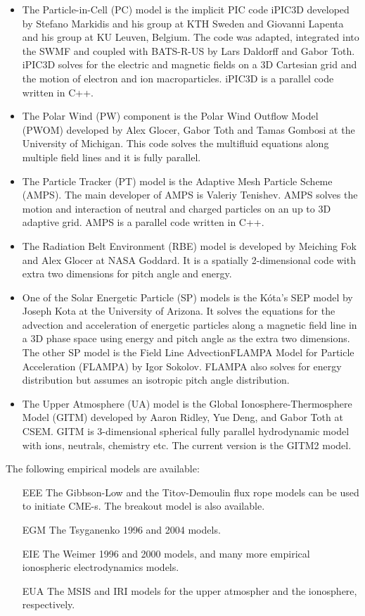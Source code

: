 \begin{itemize}
\item
The Particle-in-Cell (PC) model is the implicit PIC code iPIC3D
developed by Stefano Markidis and his group at KTH Sweden
and Giovanni Lapenta and his group at KU Leuven, Belgium.
The code was adapted, integrated into the SWMF and coupled
with BATS-R-US by Lars Daldorff and Gabor Toth.
iPIC3D solves for the electric and magnetic fields on 
a 3D Cartesian grid and the motion of electron and ion
macroparticles. iPIC3D is a parallel code written in C++. 

\item
The Polar Wind (PW) component is the Polar Wind Outflow Model (PWOM)
developed by Alex Glocer, Gabor Toth and Tamas Gombosi
at the University of Michigan.  This code solves the
multifluid equations along multiple field lines and it is fully parallel.

\item
The Particle Tracker (PT) model is the Adaptive Mesh Particle Scheme (AMPS).
The main developer of AMPS is Valeriy Tenishev. AMPS solves the motion
and interaction of neutral and charged particles on an up to 3D 
adaptive grid. AMPS is a parallel code written in C++.

\item
The Radiation Belt Environment (RBE) model is developed by Meiching Fok
and Alex Glocer at NASA Goddard. It is a spatially 2-dimensional code with 
extra two dimensions for pitch angle and energy. 

\item
One of the Solar Energetic Particle (SP) models is the
K\'ota's SEP model by Joseph Kota at the University of Arizona.
It solves the equations for the advection and acceleration of
energetic particles along a magnetic field line in a 3D phase space
using energy and pitch angle as the extra two dimensions.
The other SP model is the Field Line AdvectionFLAMPA Model for 
Particle Acceleration (FLAMPA) by Igor Sokolov. FLAMPA also solves
for energy distribution but assumes an isotropic pitch angle distribution.

\item
The Upper Atmosphere (UA) model is the 
Global Ionosphere-Thermosphere Model (GITM) 
developed by Aaron Ridley, Yue Deng, and Gabor Toth at CSEM.
GITM is 3-dimensional spherical
fully parallel hydrodynamic model with ions, neutrals, chemistry etc.
The current version is the GITM2 model.

\end{itemize}
The following empirical models are available:
\begin{itemize}
\item[EEE] The Gibbson-Low and the Titov-Demoulin flux rope models
          can be used to initiate CME-s. The breakout model is
          also available.
\item[EGM] The Tsyganenko 1996 and 2004 models.
\item[EIE] The Weimer 1996 and 2000 models, and many more empirical
          ionospheric electrodynamics models.
\item[EUA] The MSIS and IRI models for the upper atmospher and the 
          ionosphere, respectively.
\end{itemize}

